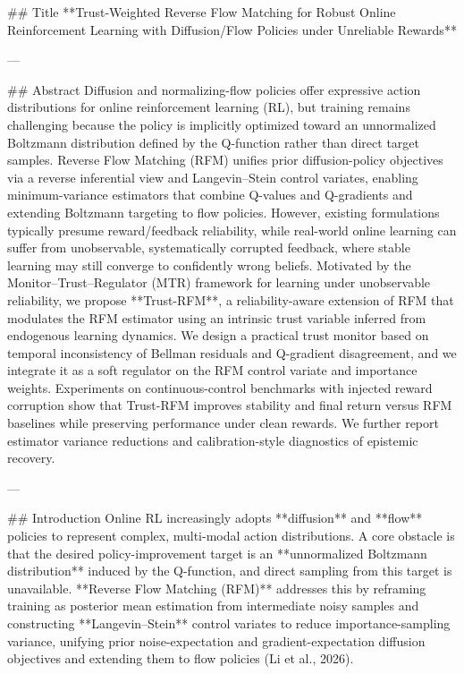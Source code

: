 ## Title  
**Trust-Weighted Reverse Flow Matching for Robust Online Reinforcement Learning with Diffusion/Flow Policies under Unreliable Rewards**

---

## Abstract  
Diffusion and normalizing-flow policies offer expressive action distributions for online reinforcement learning (RL), but training remains challenging because the policy is implicitly optimized toward an unnormalized Boltzmann distribution defined by the Q-function rather than direct target samples. Reverse Flow Matching (RFM) unifies prior diffusion-policy objectives via a reverse inferential view and Langevin–Stein control variates, enabling minimum-variance estimators that combine Q-values and Q-gradients and extending Boltzmann targeting to flow policies. However, existing formulations typically presume reward/feedback reliability, while real-world online learning can suffer from unobservable, systematically corrupted feedback, where stable learning may still converge to confidently wrong beliefs. Motivated by the Monitor–Trust–Regulator (MTR) framework for learning under unobservable reliability, we propose **Trust-RFM**, a reliability-aware extension of RFM that modulates the RFM estimator using an intrinsic trust variable inferred from endogenous learning dynamics. We design a practical trust monitor based on temporal inconsistency of Bellman residuals and Q-gradient disagreement, and we integrate it as a soft regulator on the RFM control variate and importance weights. Experiments on continuous-control benchmarks with injected reward corruption show that Trust-RFM improves stability and final return versus RFM baselines while preserving performance under clean rewards. We further report estimator variance reductions and calibration-style diagnostics of epistemic recovery.

---

## Introduction  
Online RL increasingly adopts **diffusion** and **flow** policies to represent complex, multi-modal action distributions. A core obstacle is that the desired policy-improvement target is an **unnormalized Boltzmann distribution** induced by the Q-function, and direct sampling from this target is unavailable. **Reverse Flow Matching (RFM)** addresses this by reframing training as posterior mean estimation from intermediate noisy samples and constructing **Langevin–Stein** control variates to reduce importance-sampling variance, unifying prior noise-expectation and gradient-expectation diffusion objectives and extending them to flow policies (Li et al., 2026).

